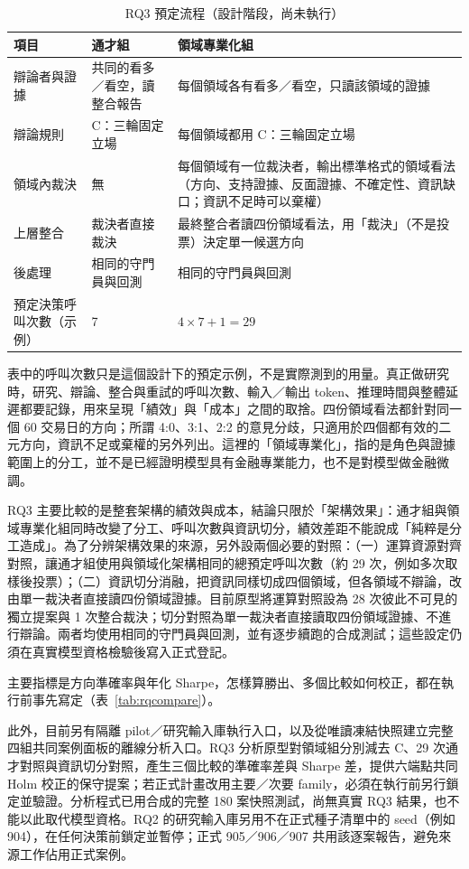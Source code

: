 \documentclass[12pt,a4paper]{article}
\numberwithin{table}{section}
\numberwithin{figure}{section}
\begin{document}
\begin{table}[H]\centering\small
\caption{RQ3 預定流程（設計階段，尚未執行）}
\label{tab:rq3flow}
\begin{tabularx}{\textwidth}{@{}L{.17} Y Y@{}}\toprule
項目 & 通才組 & 領域專業化組 \\\midrule
辯論者與證據 & 共同的看多／看空，讀整合報告 & 每個領域各有看多／看空，只讀該領域的證據 \\
辯論規則 & C：三輪固定立場 & 每個領域都用 C：三輪固定立場 \\
領域內裁決 & 無 & 每個領域有一位裁決者，輸出標準格式的領域看法（方向、支持證據、反面證據、不確定性、資訊缺口；資訊不足時可以棄權） \\
上層整合 & 裁決者直接裁決 & 最終整合者讀四份領域看法，用「裁決」（不是投票）決定單一候選方向 \\
後處理 & 相同的守門員與回測 & 相同的守門員與回測 \\
預定決策呼叫次數（示例） & 7 & $4\times7+1=29$ \\
\bottomrule\end{tabularx}\end{table}

表中的呼叫次數只是這個設計下的預定示例，不是實際測到的用量。真正做研究時，研究、辯論、整合與重試的呼叫次數、輸入／輸出 token、推理時間與整體延遲都要記錄，用來呈現「績效」與「成本」之間的取捨。四份領域看法都針對同一個 60 交易日的方向；所謂 4:0、3:1、2:2 的意見分歧，只適用於四個都有效的二元方向，資訊不足或棄權的另外列出。這裡的「領域專業化」，指的是角色與證據範圍上的分工，並不是已經證明模型具有金融專業能力，也不是對模型做金融微調。

RQ3 主要比較的是整套架構的績效與成本，結論只限於「架構效果」：通才組與領域專業化組同時改變了分工、呼叫次數與資訊切分，績效差距不能說成「純粹是分工造成」。為了分辨架構效果的來源，另外設兩個必要的對照：（一）運算資源對齊對照，讓通才組使用與領域化架構相同的總預定呼叫次數（約 29 次，例如多次取樣後投票）；（二）資訊切分消融，把資訊同樣切成四個領域，但各領域不辯論，改由單一裁決者直接讀四份領域證據。目前原型將運算對照設為 28 次彼此不可見的獨立提案與 1 次整合裁決；切分對照為單一裁決者直接讀取四份領域證據、不進行辯論。兩者均使用相同的守門員與回測，並有逐步續跑的合成測試；這些設定仍須在真實模型資格檢驗後寫入正式登記。

主要指標是方向準確率與年化 Sharpe，怎樣算勝出、多個比較如何校正，都在執行前事先寫定（表~\ref{tab:rqcompare}）。

此外，目前另有隔離 pilot／研究輸入庫執行入口，以及從唯讀凍結快照建立完整四組共同案例面板的離線分析入口。RQ3 分析原型對領域組分別減去 C、29 次通才對照與資訊切分對照，產生三個比較的準確率差與 Sharpe 差，提供六端點共同 Holm 校正的保守提案；若正式計畫改用主要／次要 family，必須在執行前另行鎖定並驗證。分析程式已用合成的完整 180 案快照測試，尚無真實 RQ3 結果，也不能以此取代模型資格。RQ2 的研究輸入庫另用不在正式種子清單中的 seed（例如 904），在任何決策前鎖定並暫停；正式 905／906／907 共用該逐案報告，避免來源工作佔用正式案例。
\end{document}
